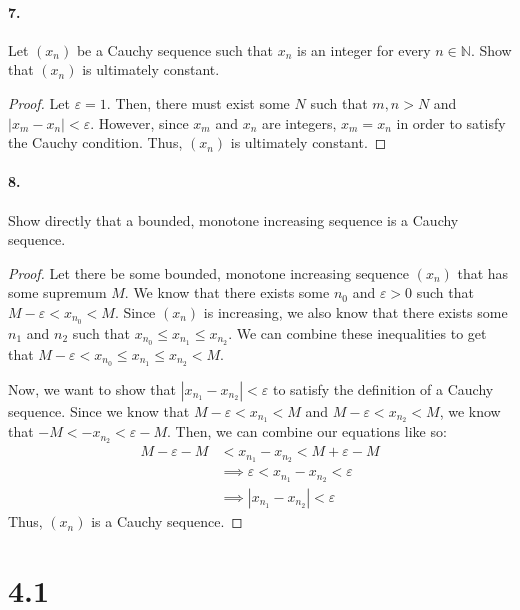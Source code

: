 \documentclass[12pt]{article}
\newcommand\N{\mathbb{N}}
\theoremstyle{remark}
\begin{document}
\paragraph{7.} Let $(x_n)$ be a Cauchy sequence such that $x_n$ is an integer for every $n \in \N$. Show that $(x_n)$ is ultimately constant.
\begin{proof}
    Let $\varepsilon = 1$. Then, there must exist some $N$ such that $m, n > N$ and $|x_m - x_n| < \varepsilon$. However, since $x_m$ and $x_n$ are integers, $x_m = x_n$ in order to satisfy the Cauchy condition. Thus, $(x_n)$ is ultimately constant.
\end{proof}

\paragraph{8.} Show directly that a bounded, monotone increasing sequence is a Cauchy sequence.
\begin{proof}
    Let there be some bounded, monotone increasing sequence $(x_n)$ that has some supremum $M$. We know that there exists some $n_0$ and $\varepsilon > 0$ such that $M - \varepsilon < x_{n_0} < M$. Since $(x_n)$ is increasing, we also know that there exists some $n_1$ and $n_2$ such that $x_{n_0} \leq x_{n_1} \leq x_{n_2}$. We can combine these inequalities to get that $M - \varepsilon < x_{n_0} \leq x_{n_1} \leq x_{n_2} < M$.

    Now, we want to show that $|x_{n_1} - x_{n_2}| < \varepsilon$ to satisfy the definition of a Cauchy sequence. Since we know that $M - \varepsilon < x_{n_1} < M$ and $M - \varepsilon < x_{n_2} < M$, we know that $-M < -x_{n_2} < \varepsilon - M$. Then, we can combine our equations like so:
    \begin{align*}
        M - \varepsilon - M &< x_{n_1} - x_{n_2} < M + \varepsilon - M \\
        &\implies \varepsilon < x_{n_1} - x_{n_2} < \varepsilon \\
        &\implies |x_{n_1} - x_{n_2}| < \varepsilon
    \end{align*}
    Thus, $(x_n)$ is a Cauchy sequence.
\end{proof}

\section*{4.1}
\end{document}
